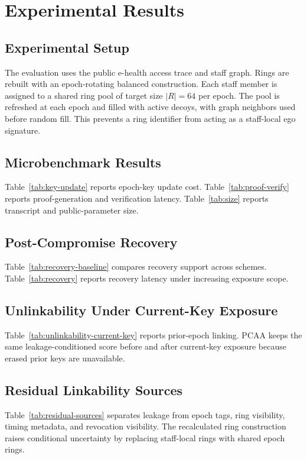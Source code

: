 \section{Experimental Results}
\label{sec:experimental-results}

\subsection{Experimental Setup}
The evaluation uses the public e-health access trace and staff graph. Rings are rebuilt with an epoch-rotating balanced construction. Each staff member is assigned to a shared ring pool of target size $|R|=64$ per epoch. The pool is refreshed at each epoch and filled with active decoys, with graph neighbors used before random fill. This prevents a ring identifier from acting as a staff-local ego signature.

\subsection{Microbenchmark Results}
Table~\ref{tab:key-update} reports epoch-key update cost. Table~\ref{tab:proof-verify} reports proof-generation and verification latency. Table~\ref{tab:size} reports transcript and public-parameter size.

\subsection{Post-Compromise Recovery}
Table~\ref{tab:recovery-baseline} compares recovery support across schemes. Table~\ref{tab:recovery} reports recovery latency under increasing exposure scope.

\subsection{Unlinkability Under Current-Key Exposure}
Table~\ref{tab:unlinkability-current-key} reports prior-epoch linking. PCAA keeps the same leakage-conditioned score before and after current-key exposure because erased prior keys are unavailable.

\subsection{Residual Linkability Sources}
Table~\ref{tab:residual-sources} separates leakage from epoch tags, ring visibility, timing metadata, and revocation visibility. The recalculated ring construction raises conditional uncertainty by replacing staff-local rings with shared epoch rings.

